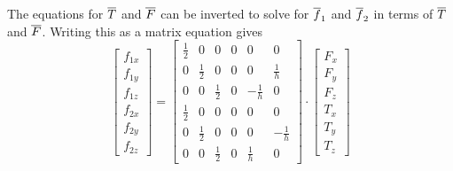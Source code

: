 \documentclass[12pt]{article}
\begin{document}
The equations for $\overline{T}$ and $\overline{F}$ can be inverted to solve for $\overline{f}_1$ and
$\overline{f}_2$ in terms of $\overline{T}$ and $\overline{F}$. Writing this as a matrix equation gives
\[
\left[\begin{array}{c}f_{1x} \\ f_{1y} \\ f_{1z} \\ f_{2x} \\ f_{2y} \\ f_{2z}
 \end{array}\right] =
\left[\begin{array}{cccccc}
\frac{1}{2} & 0 & 0 & 0 & 0 & 0 \\
0 & \frac{1}{2} & 0 & 0 & 0 & \frac{1}{h} \\
0 & 0 & \frac{1}{2} & 0 & -\frac{1}{h} & 0 \\
\frac{1}{2} & 0 & 0 & 0 & 0 & 0 \\
0 & \frac{1}{2} & 0 & 0 & 0 & -\frac{1}{h} \\
0 & 0 & \frac{1}{2} & 0  &\frac{1}{h} & 0
\end{array}\right]\cdot
\left[\begin{array}{c} F_x \\ F_y \\ F_z \\ T_x \\ T_y \\ T_z
\end{array}\right]
\]
\end{document}
